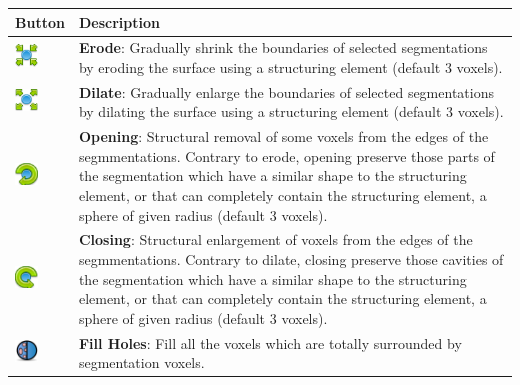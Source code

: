 \begin{tabular}{| m{1.3cm} | m{13.5cm} |}
\hline
\textbf{Button} & \textbf{Description}\\
\hline
\includegraphics[width=0.6cm]{../../frontend/rsc/erode} &
\textbf{Erode}: Gradually shrink the boundaries of selected segmentations by eroding the surface using a structuring element (default 3 voxels).\\
\hline
\includegraphics[width=0.6cm]{../../frontend/rsc/dilate} &
\textbf{Dilate}: Gradually enlarge the boundaries of selected segmentations by dilating the surface using a structuring element (default 3 voxels). \\
\hline
\includegraphics[width=0.6cm]{../../frontend/rsc/open} &
\textbf{Opening}: Structural removal of some voxels from the edges of the segmmentations. Contrary to erode, opening preserve those parts of the segmentation which have a similar shape to the structuring element, or that can completely contain the structuring element, a sphere of given radius (default 3 voxels).\\
\hline
\includegraphics[width=0.6cm]{../../frontend/rsc/close} &
\textbf{Closing}: Structural enlargement of voxels from the edges of the segmmentations. Contrary to dilate, closing preserve those cavities of the segmentation which have a similar shape to the structuring element, or that can completely contain the structuring element, a sphere of given radius (default 3 voxels).\\
\hline
\includegraphics[width=0.6cm]{../../frontend/rsc/fillHoles} &
\textbf{Fill Holes}: Fill all the voxels which are totally surrounded by
segmentation voxels.\\
\hline
\end{tabular}
